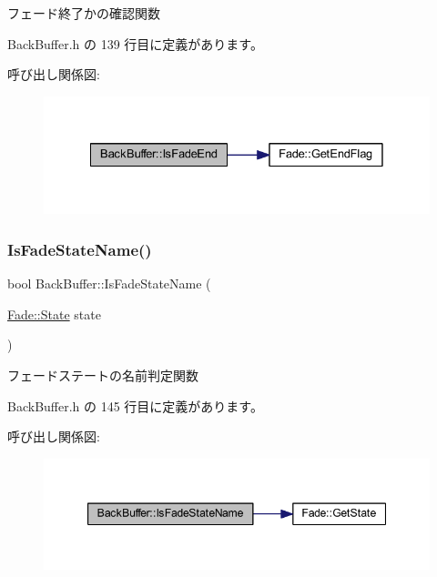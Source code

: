 フェード終了かの確認関数 



 Back\+Buffer.\+h の 139 行目に定義があります。

呼び出し関係図\+:
\nopagebreak
\begin{figure}[H]
\begin{center}
\leavevmode
\includegraphics[width=328pt]{class_back_buffer_aab8b2f4a0fdbadccdd9413c12830a377_cgraph}
\end{center}
\end{figure}
\mbox{\label{class_back_buffer_a1c13a0de1f95b8f2fea929e9306d426a}} 
\subsubsection{\texorpdfstring{Is\+Fade\+State\+Name()}{IsFadeStateName()}}
{\footnotesize\ttfamily bool Back\+Buffer\+::\+Is\+Fade\+State\+Name (\begin{DoxyParamCaption}\item[{\mbox{\hyperlink{class_fade_ae77826bf3ff2ab95fb7b3b6f95cba80a}{Fade\+::\+State}}}]{state }\end{DoxyParamCaption})\hspace{0.3cm}{\ttfamily [inline]}}



フェードステートの名前判定関数 



 Back\+Buffer.\+h の 145 行目に定義があります。

呼び出し関係図\+:
\nopagebreak
\begin{figure}[H]
\begin{center}
\leavevmode
\includegraphics[width=347pt]{class_back_buffer_a1c13a0de1f95b8f2fea929e9306d426a_cgraph}
\end{center}
\end{figure}
\mbox{\label{class_back_buffer_a04e942576ac5de94d16764d347111234}} 

